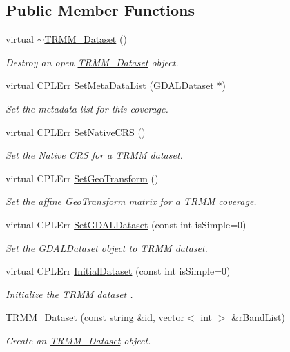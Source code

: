 \subsection*{Public Member Functions}
\begin{DoxyCompactItemize}
\item 
virtual \hyperlink{classTRMM__Dataset_a0f192409c4b2fe59ccf4d3ff949112ea}{$\sim$TRMM\_\-Dataset} ()
\begin{DoxyCompactList}\small\item\em Destroy an open \hyperlink{classTRMM__Dataset}{TRMM\_\-Dataset} object. \end{DoxyCompactList}\item 
virtual CPLErr \hyperlink{classTRMM__Dataset_aa08fe6a08a66ab7a115058a302e450a2}{SetMetaDataList} (GDALDataset $\ast$)
\begin{DoxyCompactList}\small\item\em Set the metadata list for this coverage. \end{DoxyCompactList}\item 
virtual CPLErr \hyperlink{classTRMM__Dataset_ac51d16647f04092ee01945f6e627550f}{SetNativeCRS} ()
\begin{DoxyCompactList}\small\item\em Set the Native CRS for a TRMM dataset. \end{DoxyCompactList}\item 
virtual CPLErr \hyperlink{classTRMM__Dataset_afa3309a64ccca14e96628800c69639f8}{SetGeoTransform} ()
\begin{DoxyCompactList}\small\item\em Set the affine GeoTransform matrix for a TRMM coverage. \end{DoxyCompactList}\item 
virtual CPLErr \hyperlink{classTRMM__Dataset_a4c7ca79e2b924ecc42977de339168c14}{SetGDALDataset} (const int isSimple=0)
\begin{DoxyCompactList}\small\item\em Set the GDALDataset object to TRMM dataset. \end{DoxyCompactList}\item 
virtual CPLErr \hyperlink{classTRMM__Dataset_ad1bbde527ce349adee3eacd99d40d2a5}{InitialDataset} (const int isSimple=0)
\begin{DoxyCompactList}\small\item\em Initialize the TRMM dataset . \end{DoxyCompactList}\item 
\hyperlink{classTRMM__Dataset_abcf4bc48213b91a104597302e7e4917b}{TRMM\_\-Dataset} (const string \&id, vector$<$ int $>$ \&rBandList)
\begin{DoxyCompactList}\small\item\em Create an \hyperlink{classTRMM__Dataset}{TRMM\_\-Dataset} object. \end{DoxyCompactList}\end{DoxyCompactItemize}
